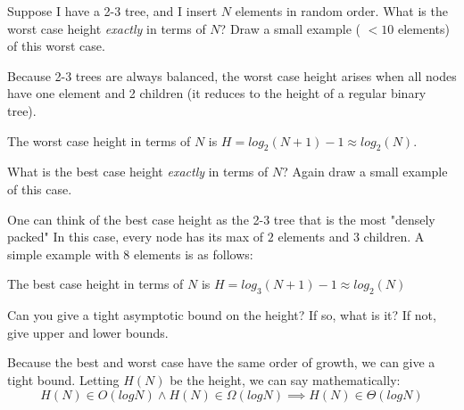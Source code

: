 \question
Suppose I have a 2-3 tree, and I insert $N$ elements in random order. What is the worst case height \textit{exactly} in terms of $N$? Draw a small example ( $< 10$ elements) of this worst case. 

\vspace{25mm}
\begin{solution}%
Because 2-3 trees are always balanced, the worst case height arises when all nodes have one element and 2 children (it reduces to the height of a regular binary tree). %

The worst case height in terms of $N$ is $H = log_{2}(N + 1) - 1 \approx log_{2}(N)$. 
\end{solution}

\question What is the best case height \textit{exactly} in terms of $N$? Again draw a small example of this case. 

\vspace{25mm}
\begin{solution}%
One can think of the best case height as the 2-3 tree that is the most "densely packed" In this case, every node has its max of $2$ elements and $3$ children. A simple example with 8 elements is as follows: %

The best case height in terms of $N$ is $H = log_{3}(N + 1) - 1 \approx log_2(N)$
\end{solution}

\question Can you give a tight asymptotic bound on the height? If so, what is it? If not, give upper and lower bounds.

\vspace{25mm}
\begin{solution}%
Because the best and worst case have the same order of growth, we can give a tight bound. Letting $H(N)$ be the height, we can say mathematically: $$H(N) \in O(logN) \land H(N) \in \Omega(logN) \implies H(N) \in \Theta(logN)$$
\end{solution}